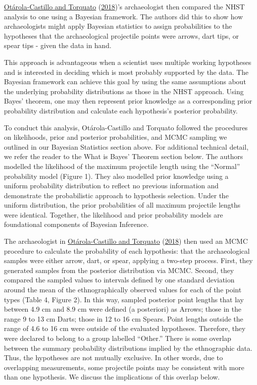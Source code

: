 \documentclass[
]{article}
\begin{document}
\protect\hyperlink{ref-otarola-castillo_bayesian_2018}{Otárola-Castillo
and Torquato}
(\protect\hyperlink{ref-otarola-castillo_bayesian_2018}{2018})'s
archaeologist then compared the NHST analysis to one using a Bayesian
framework. The authors did this to show how archaeologists might apply
Bayesian statistics to assign probabilities to the hypotheses that the
archaeological projectile points were arrows, dart tips, or spear tips -
given the data in hand.

This approach is advantageous when a scientist uses multiple working
hypotheses and is interested in deciding which is most probably
supported by the data. The Bayesian framework can achieve this goal by
using the same assumptions about the underlying probability
distributions as those in the NHST approach. Using Bayes' theorem, one
may then represent prior knowledge as a corresponding prior probability
distribution and calculate each hypothesis's posterior probability.

To conduct this analysis, Otárola-Castillo and Torquato followed the
procedures on likelihoods, prior and posterior probabilities, and MCMC
sampling we outlined in our Bayesian Statistics section above. For
additional technical detail, we refer the reader to the What is Bayes'
Theorem section below. The authors modelled the likelihood of the
maximum projectile length using the ``Normal'' probability model (Figure
1). They also modelled prior knowledge using a uniform probability
distribution to reflect no previous information and demonstrate the
probabilistic approach to hypothesis selection. Under the uniform
distribution, the prior probabilities of all maximum projectile lengths
were identical. Together, the likelihood and prior probability models
are foundational components of Bayesian Inference.

The archaeologist in
\protect\hyperlink{ref-otarola-castillo_bayesian_2018}{Otárola-Castillo
and Torquato}
(\protect\hyperlink{ref-otarola-castillo_bayesian_2018}{2018}) then used
an MCMC procedure to calculate the probability of each hypothesis: that
the archaeological samples were either arrow, dart, or spear, applying a
two-step process. First, they generated samples from the posterior
distribution via MCMC. Second, they compared the sampled values to
intervals defined by one standard deviation around the mean of the
ethnographically observed values for each of the point types (Table 4,
Figure 2). In this way, sampled posterior point lengths that lay between
4.9 cm and 8.9 cm were defined (a posteriori) as Arrows; those in the
range 9 to 13 cm Darts; those in 12 to 16 cm Spears. Point lengths
outside the range of 4.6 to 16 cm were outside of the evaluated
hypotheses. Therefore, they were declared to belong to a group labelled
``Other.'' There is some overlap between the summary probability
distributions implied by the ethnographic data. Thus, the hypotheses are
not mutually exclusive. In other words, due to overlapping measurements,
some projectile points may be consistent with more than one hypothesis.
We discuss the implications of this overlap below.
\end{document}

